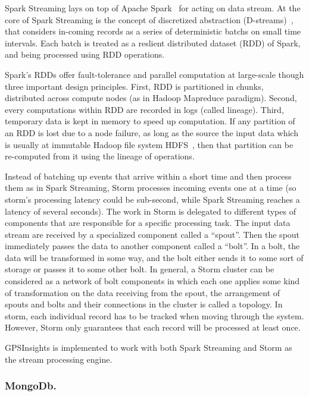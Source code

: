 \documentclass{acm_proc_article-sp}
\begin{document}
Spark Streaming lays on top of Apache Spark~\cite{Zaharia:2010:SCC:1863103.1863113} for acting on data stream.
 At the core of Spark Streaming is the concept of discretized abstraction (D-streams)~\cite{Zaharia:2013:DSF:2517349.2522737,Zaharia:2012:DSE:2342763.2342773}, that considers in-coming records as a series of deterministic batchs on small time intervals. Each batch is treated as a reslient distributed dataset (RDD) of Spark, and being processed using RDD operations. 

 Spark's RDDs offer fault-tolerance and parallel computation at large-scale though three important design principles. First, RDD is partitioned in chunks, distributed across compute nodes (as in Hadoop Mapreduce paradigm). Second, every computations within RDD are recorded in logs (called lineage). Third, temporary data is kept in memory to speed up computation. If any partition of an RDD is lost due to a node failure, as long as the source the input data which is usually at immutable Hadoop file system HDFS~\cite{shvachko2010hadoop}, then that partition can be re-computed from it using the lineage of operations.

Instead of batching up events that arrive within a short time and then process them as in Spark Streaming, Storm processes incoming events one at a time (so storm's processing latency could be sub-second, while Spark Streaming reaches a latency of several seconds). The work in Storm is delegated to different types of components that are responsible for a specific processing task. The input data stream are received by a specialized component called a ``spout''. Then the spout immediately passes the data to another component called a ``bolt''. In a bolt, the data will be transformed in some way, and the bolt either sends it to some sort of storage or passes it to some other bolt. In general, a Storm cluster can be considered as a network of bolt components in which each one applies some kind of transformation on the data receiving from the spout, the arrangement of spouts and bolts and their connections in the cluster is called a topology. In storm, each individual record has to be tracked when moving through the system. However, Storm only guarantees that each record will be processed at least once.

GPSInsights is implemented to work with both Spark Streaming and Storm as the stream processing engine.

\subsubsection{MongoDb.}
\end{document}
